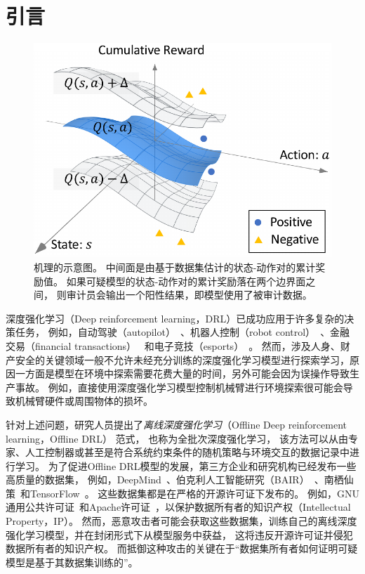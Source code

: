 \section{引言}
\label{sec:intro}
\begin{figure}[!t]
    \centering
    \includegraphics[width=0.5\hsize]{figure/orl_auditor/intuition-v1.pdf}
    \caption{
    \sysnameo 机理的示意图。
    中间面是由基于数据集估计的状态-动作对的累计奖励值。
    如果可疑模型的状态-动作对的累计奖励落在两个边界面之间，
    则审计员会输出一个阳性结果，即模型使用了被审计数据。}
    \label{fig:intuition}
\end{figure}

深度强化学习（Deep reinforcement learning，DRL）已成功应用于许多复杂的决策任务，
例如，自动驾驶（autopilot）~\cite{FHOL18}、机器人控制（robot control）~\cite{A17}、金融交易（financial transactions）~\cite{DBKRD17} 和电子竞技（esports）~\cite{SSSAHGHBLB17,BBCCDDFFHHJGOPPPRSSSSSTWZ19}。
然而，涉及人身、财产安全的关键领域一般不允许未经充分训练的深度强化学习模型进行探索学习，原因一方面是模型在环境中探索需要花费大量的时间，另外可能会因为误操作导致生产事故。
例如，直接使用深度强化学习模型控制机械臂进行环境探索很可能会导致机械臂硬件或周围物体的损坏。

针对上述问题，研究人员提出了\textit{离线深度强化学习}（Offline Deep reinforcement learning，Offline DRL）\cite{DBLP:journals/corr/abs-2005-01643} 范式，
也称为全批次深度强化学习\cite{DBLP:books/sp/12/LangeGR12}，
该方法可以从由专家、人工控制器或甚至是符合系统约束条件的随机策略与环境交互的数据记录中进行学习。
为了促进Offline DRL模型的发展，第三方企业和研究机构已经发布一些高质量的数据集，
例如，DeepMind~\cite{DBLP:journals/corr/abs-2006-13888}、伯克利人工智能研究（BAIR）~\cite{DBLP:journals/corr/abs-2004-07219}、南栖仙策~\cite{DBLP:journals/corr/abs-2102-00714}和TensorFlow~\cite{tensorflow2015-whitepaper}。
这些数据集都是在严格的开源许可证下发布的。
例如，GNU通用公共许可证~\cite{DBLP:journals/corr/BeattieLTWWKLGV16}和Apache许可证~\cite{DBLP:journals/corr/abs-2006-13888, DBLP:journals/corr/abs-2004-07219, tensorflow2015-whitepaper}，以保护数据所有者的知识产权（Intellectual Property，IP）。
然而，恶意攻击者可能会获取这些数据集，训练自己的离线深度强化学习模型，并在封闭形式下从模型服务中获益，
这将违反开源许可证并侵犯数据所有者的知识产权。
而抵御这种攻击的关键在于“数据集所有者如何证明可疑模型是基于其数据集训练的”。

